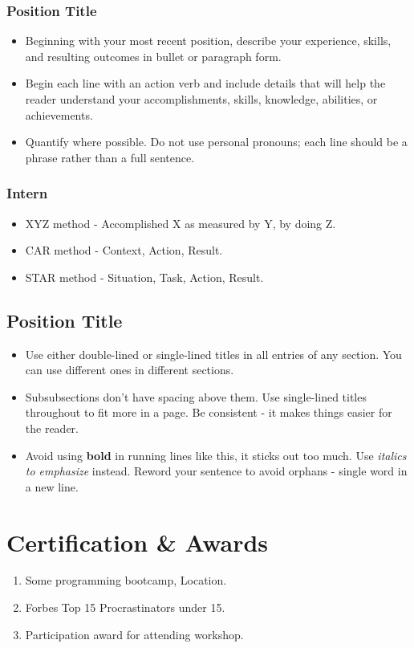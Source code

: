 \documentclass[11pt]{article}
\begin{document}
\subsubsection{Position Title }
\begin{itemize}
	\item Beginning with your most recent position, describe your experience, skills, and resulting outcomes in bullet or paragraph form.
	\item Begin each line with an action verb and include details that will help the reader understand your accomplishments, skills, knowledge, abilities, or achievements.
	\item Quantify where possible. Do not use personal pronouns; each line should be a phrase rather than a full sentence.
\end{itemize}

\subsubsection{Intern }
\begin{itemize}
	\item XYZ method - Accomplished X as measured by Y, by doing Z.
	\item CAR method - Context, Action, Result. 
	\item STAR method - Situation, Task, Action, Result.
\end{itemize}

\subsection{Position Title  }
\begin{itemize}
	\item Use either double-lined or single-lined titles in all entries of any section. You can use different ones in different sections.
	\item Subsubsections don't have spacing above them. Use single-lined titles throughout to fit more in a page. Be consistent - it makes things easier for the reader.
	\item Avoid using \textbf{bold} in running lines like this, it sticks out too much. Use \textit{italics to emphasize} instead. Reword your sentence to avoid orphans - single word in a new line.
\end{itemize}


\section{Certification \& Awards}
\begin{enumerate}
	\item[2023] Some programming bootcamp, Location.
	\item[2022] Forbes Top 15 Procrastinators under 15.
	\item[2021] Participation award for attending workshop.
\end{enumerate}
\end{document}

